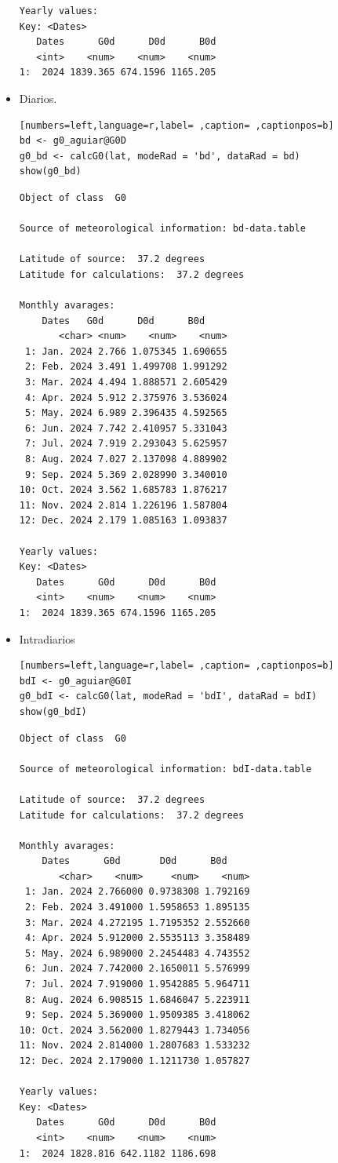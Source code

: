 \begin{itemize}
\begin{verbatim}
Yearly values:
Key: <Dates>
   Dates      G0d      D0d      B0d
   <int>    <num>    <num>    <num>
1:  2024 1839.365 674.1596 1165.205
\end{verbatim}

\item Diarios.
\begin{lstlisting}[numbers=left,language=r,label= ,caption= ,captionpos=b]
bd <- g0_aguiar@G0D
g0_bd <- calcG0(lat, modeRad = 'bd', dataRad = bd)
show(g0_bd)
\end{lstlisting}

\begin{verbatim}
Object of class  G0 

Source of meteorological information: bd-data.table 

Latitude of source:  37.2 degrees
Latitude for calculations:  37.2 degrees

Monthly avarages:
	Dates   G0d      D0d      B0d
       <char> <num>    <num>    <num>
 1: Jan. 2024 2.766 1.075345 1.690655
 2: Feb. 2024 3.491 1.499708 1.991292
 3: Mar. 2024 4.494 1.888571 2.605429
 4: Apr. 2024 5.912 2.375976 3.536024
 5: May. 2024 6.989 2.396435 4.592565
 6: Jun. 2024 7.742 2.410957 5.331043
 7: Jul. 2024 7.919 2.293043 5.625957
 8: Aug. 2024 7.027 2.137098 4.889902
 9: Sep. 2024 5.369 2.028990 3.340010
10: Oct. 2024 3.562 1.685783 1.876217
11: Nov. 2024 2.814 1.226196 1.587804
12: Dec. 2024 2.179 1.085163 1.093837

Yearly values:
Key: <Dates>
   Dates      G0d      D0d      B0d
   <int>    <num>    <num>    <num>
1:  2024 1839.365 674.1596 1165.205
\end{verbatim}

\item Intradiarios
\begin{lstlisting}[numbers=left,language=r,label= ,caption= ,captionpos=b]
bdI <- g0_aguiar@G0I
g0_bdI <- calcG0(lat, modeRad = 'bdI', dataRad = bdI)
show(g0_bdI)
\end{lstlisting}

\begin{verbatim}
Object of class  G0 

Source of meteorological information: bdI-data.table 

Latitude of source:  37.2 degrees
Latitude for calculations:  37.2 degrees

Monthly avarages:
	Dates      G0d       D0d      B0d
       <char>    <num>     <num>    <num>
 1: Jan. 2024 2.766000 0.9738308 1.792169
 2: Feb. 2024 3.491000 1.5958653 1.895135
 3: Mar. 2024 4.272195 1.7195352 2.552660
 4: Apr. 2024 5.912000 2.5535113 3.358489
 5: May. 2024 6.989000 2.2454483 4.743552
 6: Jun. 2024 7.742000 2.1650011 5.576999
 7: Jul. 2024 7.919000 1.9542885 5.964711
 8: Aug. 2024 6.908515 1.6846047 5.223911
 9: Sep. 2024 5.369000 1.9509385 3.418062
10: Oct. 2024 3.562000 1.8279443 1.734056
11: Nov. 2024 2.814000 1.2807683 1.533232
12: Dec. 2024 2.179000 1.1211730 1.057827

Yearly values:
Key: <Dates>
   Dates      G0d      D0d      B0d
   <int>    <num>    <num>    <num>
1:  2024 1828.816 642.1182 1186.698
\end{verbatim}
\end{itemize}

